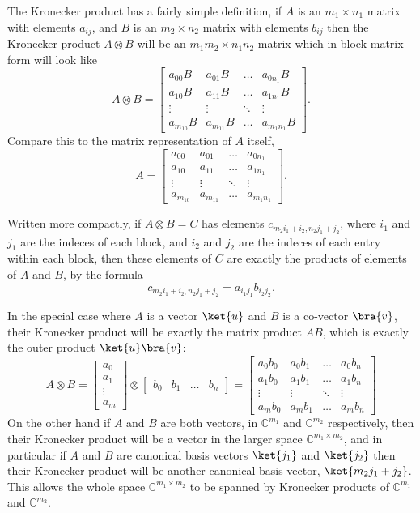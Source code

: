 The Kronecker product has a fairly simple definition, if $A$ is an $m_1 \times n_1$ matrix with elements $a_{ij}$, and $B$ is an $m_2 \times n_2$ matrix with elements $b_{ij}$ then the Kronecker product $A \otimes B$ will be an $m_1m_2 \times n_1n_2$ matrix which in block matrix form will look like
\[
A\otimes B = \left[\begin{matrix}
		a_{00}B & a_{01}B & \dots & a_{0n_1}B\\
		a_{10}B & a_{11}B & \dots & a_{1n_1}B\\
		\vdots & \vdots & \ddots & \vdots\\
		a_{m_10}B & a_{m_11}B & \dots & a_{m_1n_1}B
	\end{matrix}\right].
\]
Compare this to the matrix representation of $A$ itself,
\[
	A = \left[\begin{matrix}
	a_{00} & a_{01} & \dots & a_{0n_1}\\
	a_{10} & a_{11} & \dots & a_{1n_1}\\
	\vdots & \vdots & \ddots & \vdots\\
	a_{m_10} & a_{m_11} & \dots & a_{m_1n_1}
\end{matrix}\right].
\]

Written more compactly, if $A\otimes B = C$ has elements $c_{m_2i_1 + i_2,n_2j_1+j_2}$, where $i_1$ and $j_1$ are the indeces of each block, and $i_2$ and $j_2$ are the indeces of each entry within each block, then these elements of $C$ are exactly the products of elements of $A$ and $B$, by the formula
\[c_{m_2i_1 + i_2,n_2j_1+j_2} = a_{i_1j_1}b_{i_2j_2}.\]

In the special case where $A$ is a vector $\ket{u}$ and $B$ is a co-vector $\bra{v}$, their Kronecker product will be exactly the matrix product $AB$, which is exactly the outer product $\ket{u}\bra{v}$:
\[
A \otimes B =
\left[\begin{matrix}
	a_0\\a_1\\\vdots\\a_m
\end{matrix}\right]
\otimes
\left[\begin{matrix}
	b_0&b_1&\dots&b_n
\end{matrix}\right]
=
\left[\begin{matrix}
	a_0b_0 & a_0b_1 & \dots & a_0b_n\\
	a_1b_0 & a_1b_1 & \dots & a_1b_n\\
	\vdots & \vdots & \ddots & \vdots\\
	a_mb_0 & a_mb_1 & \dots & a_mb_n
\end{matrix}\right]
\]
On the other hand if $A$ and $B$ are both vectors, in $\mathbb{C}^{m_1}$ and $\mathbb{C}^{m_2}$ respectively, then their Kronecker product will be a vector in the larger space $\mathbb{C}^{m_1\times m_2}$, and in particular if $A$ and $B$ are canonical basis vectors $\ket{j_1}$ and $\ket{j_2}$ then their Kronecker product will be another canonical basis vector, $\ket{m_2j_1 + j_2}$. This allows the whole space $\mathbb{C}^{m_1 \times m_2}$ to be spanned by Kronecker products of $\mathbb{C}^{m_1}$ and $\mathbb{C}^{m_2}$.

